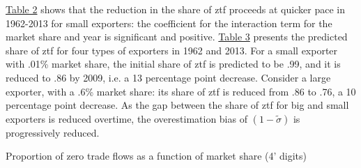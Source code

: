 \documentclass[12pt,twoside,a4paper,notitlepage]{article}
\begin{document}
{{\hyperref[ref-005]{Table 2}} shows that the reduction in the share of ztf proceeds at quicker pace in 1962-2013 for small exporters: the coefficient for the interaction term for the market share and year is significant and positive. {\hyperref[ref-006]{Table 3}} presents the predicted share of ztf for four types of exporters in 1962 and 2013. For a  small exporter with .01\% market share, the initial share of ztf is predicted to be .99, and it is reduced to .86 by 2009, i.e. a 13 percentage point decrease. Consider a large exporter, with a .6\% market share: its share of ztf is reduced from .86 to .76, a 10 percentage point decrease. As the gap between the share of ztf for big and small exporters is reduced overtime, the overestimation bias of $(1-\tilde{\sigma })$ is progressively reduced.

 

\begin{table}
\caption{ \label{ref-005} Proportion of zero trade flows as a function of market share (4' digits)}


\end{table}



\label{ref-006}



}
\end{document}
